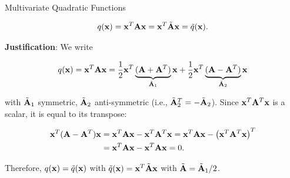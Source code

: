 \documentclass[11pt,compress,t,notes=noshow, xcolor=table]{beamer}
\begin{document}
\begin{vbframe}{Multivariate Quadratic Functions}
\vspace*{-0.5\baselineskip}

\begin{equation*}
    q(\mathbf{x}) = \mathbf{x}^T \mathbf{A} \mathbf{x} = \mathbf{x}^T \tilde {\mathbf{A}} \mathbf{x} = \tilde q(\mathbf{x}).
\end{equation*}

\textbf{Justification}: We write

\begin{equation*}
    q(\mathbf{x}) = \mathbf{x}^T \mathbf{A} \mathbf{x} = \frac{1}{2} \mathbf{x}^T \underbrace{(\mathbf{A} + \mathbf{A}^T)}_{\tilde {\mathbf{A}}_1} \mathbf{x} + \frac{1}{2} \mathbf{x}^T \underbrace{(\mathbf{A} - \mathbf{A}^T)}_{\tilde {\mathbf{A}}_2} \mathbf{x}
\end{equation*}

with $\tilde {\mathbf{A}}_1$ symmetric, $\tilde {\mathbf{A}}_2$ anti-symmetric (i.e., $\tilde {\mathbf{A}}_2^T = - \tilde {\mathbf{A}}_2$). Since $\mathbf{x}^T \mathbf{A}^T \mathbf{x}$ is a scalar, it is equal to its transpose: 

\vspace*{-1.25\baselineskip}

\begin{align*}
    \mathbf{x}^T (\mathbf{A} - \mathbf{A}^T) \mathbf{x} &=  \mathbf{x}^T \mathbf{A} \mathbf{x} - \mathbf{x}^T \mathbf{A}^T \mathbf{x} =  \mathbf{x}^T \mathbf{A} \mathbf{x} - \left(\mathbf{x}^T \mathbf{A}^T \mathbf{x}\right)^T \\
    &= \mathbf{x}^T \mathbf{A} \mathbf{x} - \mathbf{x}^T \mathbf{A} \mathbf{x}  = 0.
\end{align*}

Therefore, $q(\mathbf{x}) = \tilde q(\mathbf{x})$ with $\tilde q(\mathbf{x}) = \mathbf{x}^T \tilde {\mathbf{A}} \mathbf{x}$ with $\tilde {\mathbf{A}} = \tilde {\mathbf{A}}_1/2$. 

\end{vbframe}
\end{document}
